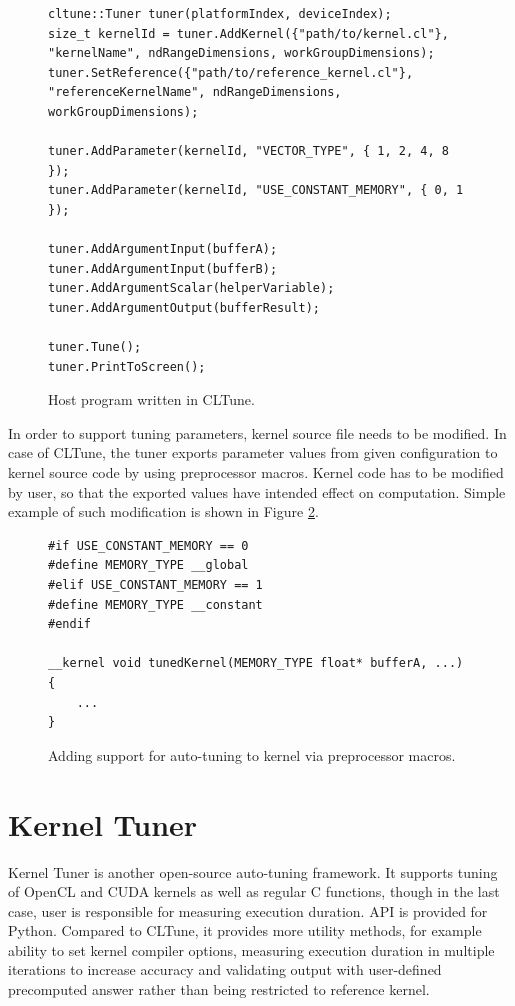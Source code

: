 \documentclass
[
    digital, %
    oneside, %
    table, %
    nolof, %
    nolot, %
    nocover %
]{fithesis3}
\begin{document}
\begin{figure}
\begin{adjustwidth}{-1cm}{-1cm}
\begin{lstlisting}
cltune::Tuner tuner(platformIndex, deviceIndex);
size_t kernelId = tuner.AddKernel({"path/to/kernel.cl"}, "kernelName", ndRangeDimensions, workGroupDimensions);
tuner.SetReference({"path/to/reference_kernel.cl"}, "referenceKernelName", ndRangeDimensions, workGroupDimensions);

tuner.AddParameter(kernelId, "VECTOR_TYPE", { 1, 2, 4, 8 });
tuner.AddParameter(kernelId, "USE_CONSTANT_MEMORY", { 0, 1 });

tuner.AddArgumentInput(bufferA);
tuner.AddArgumentInput(bufferB);
tuner.AddArgumentScalar(helperVariable);
tuner.AddArgumentOutput(bufferResult);

tuner.Tune();
tuner.PrintToScreen();
\end{lstlisting}
\caption{Host program written in CLTune.}
\label{cltune-example}
\end{adjustwidth}
\end{figure}

In order to support tuning parameters, kernel source file needs to be modified. In case of CLTune, the tuner exports parameter values from given
configuration to kernel source code by using preprocessor macros. Kernel code has to be modified by user, so that the exported values have intended
effect on computation. Simple example of such modification is shown in Figure \ref{cltune-example-kernel}.
\begin{figure}
\begin{lstlisting}
#if USE_CONSTANT_MEMORY == 0
#define MEMORY_TYPE __global
#elif USE_CONSTANT_MEMORY == 1
#define MEMORY_TYPE __constant
#endif

__kernel void tunedKernel(MEMORY_TYPE float* bufferA, ...)
{
    ...
}
\end{lstlisting}
\caption{Adding support for auto-tuning to kernel via preprocessor macros.}
\label{cltune-example-kernel}
\end{figure}

\section{Kernel Tuner}
Kernel Tuner \cite{kerneltuner} is another open-source auto-tuning framework. It supports tuning of OpenCL and CUDA kernels as well as regular C functions,
though in the last case, user is responsible for measuring execution duration. API is provided for Python. Compared to CLTune, it provides more utility
methods, for example ability to set kernel compiler options, measuring execution duration in multiple iterations to increase accuracy and validating output
with user-defined precomputed answer rather than being restricted to reference kernel.
\end{document}
